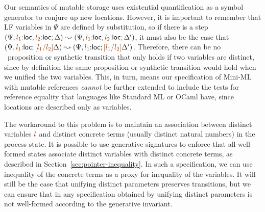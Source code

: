 Our semantics of mutable storage uses existential quantification 
as a symbol generator to conjure up new locations. However, it is important
to remember that LF variables in $\Psi$ are defined by substitution,
so if there is a step 
$(\Psi, \lf{l_1}{:}{\sf loc}, \lf{l_2}{:}{\sf loc}; \Delta)
  \leadsto 
 (\Psi, \lf{l_1}{:}{\sf loc}, \lf{l_2}{:}{\sf loc}; \Delta')$,
it must also be the case that 
$(\Psi, \lf{l_1}{:}{\sf loc}; \lf{[l_1/l_2]}\Delta)
  \leadsto 
 (\Psi, \lf{l_1}{:}{\sf loc}; \lf{[l_1/l_2]}\Delta')$. 
%
Therefore, 
%
there can be no \sls~proposition or synthetic transition that only
holds if two variables are distinct, since by definition the
same proposition or synthetic transition would hold when we unified
the two variables.
%
This, in turn, means our specification of Mini-ML with mutable
references {\it cannot} be further extended to include the tests for
reference equality that languages like Standard ML or OCaml have, since
locations are described only as variables. 

The workaround to this problem is to maintain an association between 
distinct variables $\lf{l}$ and distinct concrete terms (usually
distinct natural numbers) in the process state. It is possible
to use generative signatures to enforce that all well-formed
states associate distinct variables with distinct concrete terms, as 
described in Section~\ref{sec:pointer-inequality}. In such 
a specification, we can use inequality of the concrete terms as 
a proxy for inequality of the variables. It will still
be the case that unifying distinct parameters preserves transitions,
but we can ensure that in any specification obtained by unifying
distinct parameters is not well-formed according to the generative
invariant.







